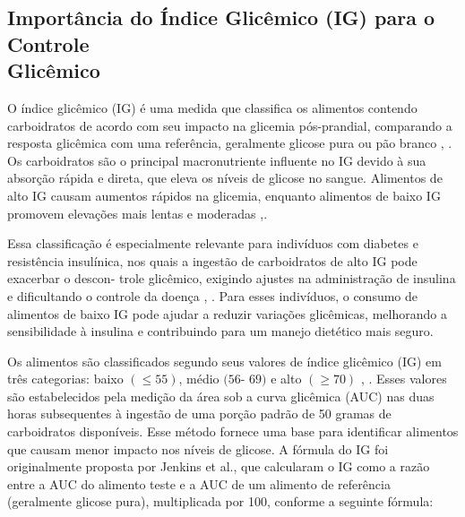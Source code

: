\documentclass[conference]{IEEEtran}
\begin{document}
\subsection{Importância do Índice Glicêmico (IG) para o Controle \\Glicêmico}
\sloppy
O índice glicêmico (IG) é uma medida que classifica os 
alimentos contendo carboidratos de acordo com seu impacto 
na glicemia pós-prandial, comparando a resposta glicêmica 
com uma referência, geralmente glicose pura ou pão branco 
\cite{b4}, \cite{b27}. Os carboidratos são o principal macronutriente 
influente no IG devido à sua absorção rápida e direta, que 
eleva os níveis de glicose no sangue. Alimentos de alto IG 
causam aumentos rápidos na glicemia, enquanto alimentos 
de baixo IG promovem elevações mais lentas e moderadas 
\cite{b24},\cite{b5}. 
\par
Essa classificação é especialmente relevante para 
indivíduos com diabetes e resistência insulínica, nos quais a 
ingestão de carboidratos de alto IG pode exacerbar o descon-
trole glicêmico, exigindo ajustes na administração de insulina 
e dificultando o controle da doença \cite{b25}, \cite{b26}. Para esses 
indivíduos, o consumo de alimentos de baixo IG pode ajudar 
a reduzir variações glicêmicas, melhorando a sensibilidade 
à insulina e contribuindo para um manejo dietético mais
seguro. 
\par
Os alimentos são classificados segundo seus valores 
de índice glicêmico (IG) em três categorias: baixo \((\le55)\), médio \((56\)-
\(69)\) e alto \((\ge 70)\) \cite{b4}, \cite{b27}. Esses valores são estabelecidos 
pela medição da área sob a curva glicêmica (AUC) nas duas 
horas subsequentes à ingestão de uma porção padrão de 50
gramas de carboidratos disponíveis. Esse método fornece uma 
base para identificar alimentos que causam menor impacto nos 
níveis de glicose. A fórmula do IG foi originalmente proposta 
por Jenkins et al., que calcularam o IG como a razão entre a
AUC do alimento teste e a AUC de um alimento de referência 
(geralmente glicose pura), multiplicada por 100, conforme a 
seguinte fórmula:
\end{document}
